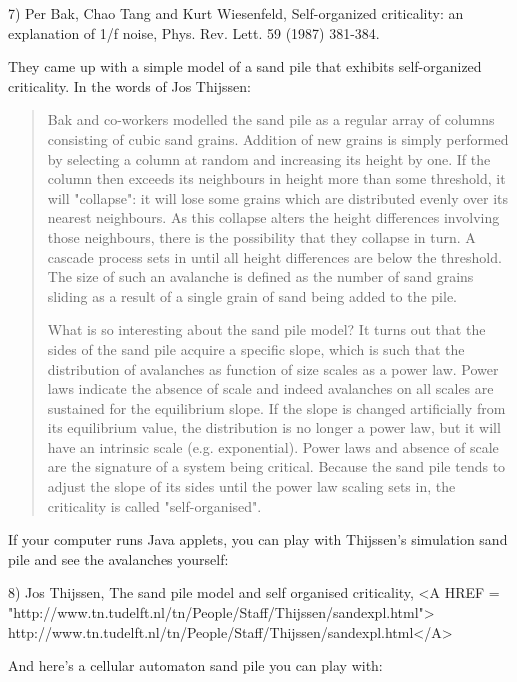 7) Per Bak, Chao Tang and Kurt Wiesenfeld, Self-organized criticality: 
an explanation of 1/f noise, Phys. Rev. Lett. 59 (1987) 381-384.  

They came up with a simple model of a sand pile that exhibits 
self-organized criticality.  In the words of Jos Thijssen:

\begin{quote}
     Bak and co-workers modelled the sand pile as a regular array 
     of columns consisting of cubic sand grains.  Addition of new 
     grains is simply performed by selecting a column at random and 
     increasing its height by one.  If the column then exceeds its 
     neighbours in height more than some threshold, it 
     will "collapse": 
     it will lose some grains which are distributed evenly over its 
     nearest neighbours.  As this collapse alters the height differences 
     involving those neighbours, there is the possibility that they 
     collapse in turn.  A cascade process sets in until all height 
     differences are below the threshold. The size of such an avalanche 
     is defined as the number of sand grains sliding as a result of 
     a single grain of sand being added to the pile.

     What is so interesting about the sand pile model?  It turns out 
     that the sides of the sand pile acquire a specific slope, which is 
     such that the distribution of avalanches as function of size scales 
     as a power law. Power laws indicate the absence of scale and indeed 
     avalanches on all scales are sustained for the equilibrium slope. 
     If the slope is changed artificially from its equilibrium value, 
     the distribution is no longer a power law, but it will have an 
     intrinsic scale (e.g. exponential).  Power laws and absence of scale 
     are the signature of a system being critical.  Because the sand pile 
     tends to adjust the slope of its sides until the power law scaling 
     sets in, the criticality is called "self-organised".
\end{quote}

If your computer runs Java applets, you can play with Thijssen's
simulation sand pile and see the avalanches yourself:

8) Jos Thijssen, The sand pile model and self organised criticality,
<A HREF = "http://www.tn.tudelft.nl/tn/People/Staff/Thijssen/sandexpl.html">
http://www.tn.tudelft.nl/tn/People/Staff/Thijssen/sandexpl.html</A>

And here's a cellular automaton sand pile you can play with:   

